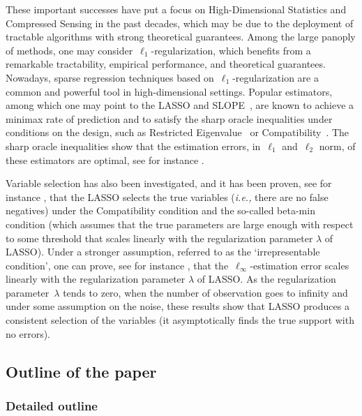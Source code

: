 \documentclass[final,numbib]{imaiai}%
\numberwithin{equation}{section}
\newcommand{\<}{\langle}
\renewcommand{\>}{\rangle}
\newcommand{\1}{\mathds{1}}
\begin{document}
{{{These important successes have put a focus on High-Dimensional Statistics and Compressed Sensing in the past decades, which may be due to the deployment of tractable algorithms with strong theoretical guarantees.
 Among the large panoply of methods, one may consider~$\ell_1$-regularization, which benefits from a remarkable tractability, empirical performance, and theoretical guarantees.
Nowadays, sparse regression techniques based on~$\ell_1$-regularization are a common and powerful tool in high-dimensional settings.
Popular estimators, among which one may point to the LASSO \citep{tibshirani1996regression} and SLOPE~\citep{bogdan2015slope}, are known to achieve a minimax rate of prediction and to satisfy the sharp oracle inequalities under conditions on the design, such as Restricted Eigenvalue~\citep{bickel2009simultaneous,bellec2018slope} or Compatibility~\citep{Buhlmann_vandeGeer11,van2016estimation}.
The sharp oracle inequalities show that the estimation errors, in~$\ell_1$ and~$\ell_2$ norm, of these estimators are optimal, see for instance \cite[Chapter 2.7]{van2016estimation}.

Variable selection has also been investigated, and it has been proven, see for instance \cite[Theorem~7.5]{Buhlmann_vandeGeer11}, that the LASSO selects the true variables ({\it i.e.,} there are no false negatives) under the Compatibility condition and the so-called beta-min condition (which assumes that the true parameters are large enough with respect to some threshold that scales linearly with the regularization parameter $\lambda$ of LASSO).
Under a stronger assumption, referred to as the `irrepresentable condition', one can prove, see for instance \cite[Theorem~7.1]{Buhlmann_vandeGeer11}, that the~$\ell_\infty$-estimation error scales linearly with the regularization parameter $\lambda$ of LASSO.
As the regularization parameter~$\lambda$ tends to zero, when the number of observation goes to infinity and under some assumption on the noise, these results show that LASSO produces a consistent selection of the variables (it asymptotically finds the true support with no errors).   }

\subsection{Outline of the paper}  
\subsubsection{Detailed outline}  

}}
\end{document}
